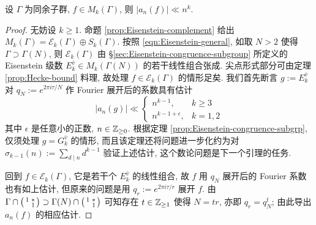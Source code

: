 \begin{theorem}\label{prop:Hecke-bound-cong}
	设 $\Gamma$ 为同余子群, $f \in M_k(\Gamma)$, 则 $|a_n(f)| \ll n^k$.
\end{theorem}
\begin{proof}
	无妨设 $k \geq 1$. 命题 \ref{prop:Eisenstein-complement} 给出 $M_k(\Gamma) = \mathcal{E}_k(\Gamma) \oplus S_k(\Gamma)$. 按照 \eqref{eqn:Eisenstein-general}, 如取 $N > 2$ 使得 $\Gamma \supset \Gamma(N)$, 则 $\mathcal{E}_k(\Gamma)$ 由 \S\ref{sec:Eisenstein-congruence-subgroup} 所定义的 Eisenstein 级数 $E_k^{\bar{v}} \in M_k(\Gamma(N))$ 的若干线性组合张成. 尖点形式部分可由定理 \ref{prop:Hecke-bound} 料理, 故处理 $f \in \mathcal{E}_k(\Gamma)$ 的情形足矣. 我们首先断言 $g := E_k^{\bar{v}}$ 对 $q_N := e^{2\pi i\tau/N}$ 作 Fourier 展开后的系数具有估计
	\[ |a_n(g)| \ll \begin{cases}
		n^{k-1}, & k \geq 3 \\
		n^{k-1+\epsilon}, & k =1,2
	\end{cases} \]
	其中 $\epsilon$ 是任意小的正数, $n \in \mathbb{Z}_{\geq 0}$. 根据定理 \ref{prop:Eisenstein-congruence-subgrp}, 仅须处理 $g = G_k^{\bar{v}}$ 的情形, 而且该定理还将问题进一步化约为对 $\sigma_{k-1}(n) := \sum_{d \mid n} d^{k-1}$ 验证上述估计, 这个数论问题是下一个引理的任务.
	
	回到 $f \in \mathcal{E}_k(\Gamma)$, 它是若干个 $E_k^{\bar{v}}$ 的线性组合, 故 $f$ 用 $q_N$ 展开后的 Fourier 系数也有如上估计, 但原来的问题是用 $q_r := e^{2\pi i\tau/r}$ 展开 $f$. 由 $\Gamma \cap \bigl(\begin{smallmatrix} 1 & * \\  & 1 \end{smallmatrix}\bigr) \supset \Gamma(N) \cap \bigl(\begin{smallmatrix} 1 & * \\  & 1 \end{smallmatrix}\bigr)$ 可知存在 $t \in \mathbb{Z}_{\geq 1}$ 使得 $N = tr$, 亦即 $q_r = q_N^t$; 由此导出 $a_n(f)$ 的相应估计.
\end{proof}

